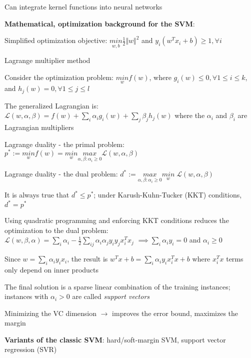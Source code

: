 \documentclass[letterpaper,fontsize=5pt]{scrartcl}
\renewenvironment{enumerate}[1]{\begin{compactenum}#1}{\end{compactenum}}
\theoremstyle{definition}
\newcommand{\Lagr}{\mathcal{L}}
\begin{document}
\begin{multicols}{2}
\begin{enumerate}
\begin{enumerate}
				\item Can integrate kernel functions into neural networks
			\end{enumerate}
		\item \textbf{Mathematical, optimization background for the SVM}:
			\begin{enumerate}
				\item Simplified optimization objective: $\underset{w,b}{min} \frac{1}{2} \Vert w \Vert ^2$ and $y_i (w^T x_i + b) \geq 1, \forall i$
				\item Lagrange multiplier method
					\begin{enumerate}
						\item Consider the optimization problem: $\underset{w}{min} f(w)$, where $g_i(w) \leq 0, \forall 1 \leq i \leq k$, and $h_j(w) = 0, \forall 1 \leq j \leq l$
						\item The generalized Lagrangian is: $\Lagr(w,\alpha,\beta) = f(w) + \sum\limits_i \alpha_i g_i(w) + \sum\limits_j \beta_j h_j(w)$ where the $\alpha_i$ and $\beta_i$ are Lagrangian multipliers
						\item Lagrange duality - the primal problem: $p^* := \underset{w}{min} f(w) = \underset{w}{min} \underset{\alpha,\beta:\alpha_i \geq 0}{max} \Lagr(w,\alpha,\beta)$
						\item Lagrange duality - the dual problem: $d^* := \underset{\alpha,\beta:\alpha_i \geq 0}{max} \underset{w}{min}\; \Lagr(w,\alpha,\beta)$
						\item It is always true that $d^* \leq p^*$; under Karush-Kuhn-Tucker (KKT) conditions, $d^* = p^*$
					\end{enumerate}
				\item Using quadratic programming and enforcing KKT conditions reduces the optimization to the dual problem: \\ $\Lagr(w,\beta,\alpha) = \sum\limits_i \alpha_i - \frac{1}{2} \sum\limits_{ij} \alpha_i \alpha_j y_i y_j x_i^T x_j$ $\implies \sum\limits_i \alpha_i y_i = 0$ and $\alpha_i \geq 0$ \\
				\item Since $w = \sum_i \alpha_i y_i x_i$, the result is $w^Tx + b = \sum_i \alpha_i y_i x_i^T x + b$ where $x_i^T x$ terms only depend on inner products
				\item The final solution is a sparse linear combination of the training instances; instances with $\alpha_i > 0$ are called \emph{support vectors}
				\item Minimizing the VC dimension $\rightarrow$ improves the error bound, maximizes the margin
			\end{enumerate}
		\item \textbf{Variants of the classic SVM}: hard/soft-margin SVM, support vector regression (SVR)
	\end{enumerate}

\end{multicols}
\end{document}
